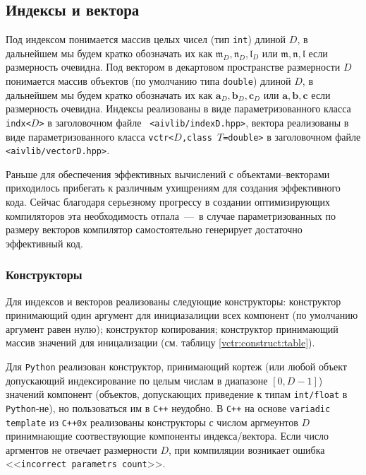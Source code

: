 \def\indx#1{\mathfrak{#1}}
\def\l{\indx{l}}
\def\m{\indx{m}}
\def\n{\indx{n}}
\def\vctr#1{\mathbf{#1}}
\def\a{\vctr{a}}
\def\b{\vctr{b}}
\def\c{\vctr{c}}


\subsection{Индексы и вектора}
Под индексом понимается массив целых чисел (тип {\tt int}) длиной $D$, в
дальнейшем мы будем кратко обозначать их как $\m_D, \n_D, \l_D$ или $\m, \n,
\l$ если размерность очевидна. Под
вектором в декартовом пространстве размерности $D$ понимается массив объектов
(по умолчанию типа {\tt double}) длиной $D$, в
дальнейшем мы будем кратко обозначать их как $\a_D, \b_D, \c_D$ или $\a, \b,
\c$ если размерность очевидна. Индексы реализованы в виде
параметризованного класса {\tt indx<$D$>} в заголовочном файле {\tt
  <aivlib/indexD.hpp>}, вектора реализованы в виде
параметризованного класса {\tt vctr<$D$,class $T$=double>} в заголовочном файле {\tt
  <aivlib/vectorD.hpp>}.

Раньше для обеспечения эффективных вычислений с объектами--векторами приходилось
прибегать к различным ухищрениям для создания эффективного кода. Сейчас
благодаря серьезному прогрессу в создании оптимизирующих компиляторов эта
необходимость отпала~---~в случае параметризованных по размеру векторов
компилятор самостоятельно генерирует достаточно эффективный код.

\subsubsection{Конструкторы}
Для индексов и векторов реализованы следующие конструкторы: конструктор
принимающий один аргумент для инициазалиции всех компонент (по умолчанию
аргумент равен нулю); конструктор копирования; конструктор принимающий массив
значений для иницализации (см. таблицу \ref{vctr:construct:table}).

Для  {\tt Python} реализован конструктор, принимающий кортеж (или любой
объект допускающий индексирование по целым числам в диапазоне $[0,D-1]$) значений компонент (объектов, допускающих
приведение к типам {\tt int/float} в  {\tt Python}-не), но
пользоваться им в {\tt C++} неудобно. 
В {\tt C++} на основе {\tt variadic template} из {\tt C++0x} реализованы конструкторы с числом аргмеунтов $D$ принимнающие 
соотвествующие компоненты индекса/вектора. Если число аргментов не отвечает размерности $D$, при компиляции возникает ошибка 
<<{\tt incorrect parametrs count}>>.
 
